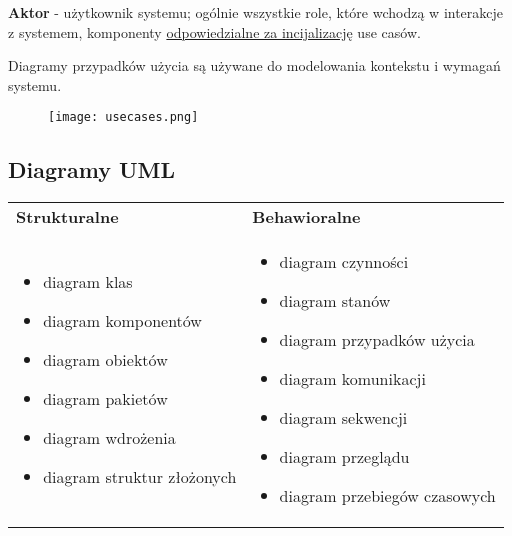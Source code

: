 \documentclass[../main.tex]{subfiles}
\begin{document}
    \textbf{Aktor} - użytkownik systemu; ogólnie wszystkie role, które wchodzą w interakcje z systemem, komponenty \underline{odpowiedzialne
    za incijalizację} use casów.

    Diagramy przypadków użycia są używane do modelowania kontekstu i wymagań systemu.

    \begin{figure}[H]
        \texttt{[image: usecases.png]}
    \end{figure}


    \subsection{Diagramy UML}
    \begin{table}[H]
        \begin{center}
            \begin{tabular}{  p{8cm} p{8cm} }
                \toprule
                \textbf{Strukturalne} & \textbf{Behawioralne}\\

                \cmidrule(r){1-1}\cmidrule(r){2-2}

                \begin{itemize}
                    \item diagram klas
                    \item diagram komponentów
                    \item diagram obiektów
                    \item diagram pakietów
                    \item diagram wdrożenia
                    \item diagram struktur złożonych
                \end{itemize}
                &
                \begin{itemize}
                    \item diagram czynności
                    \item diagram stanów
                    \item diagram przypadków użycia
                    \item diagram komunikacji
                    \item diagram sekwencji
                    \item diagram przeglądu
                    \item diagram przebiegów czasowych
                \end{itemize}
                \\

                \bottomrule
            \end{tabular}
        \end{center}
    \end{table}
\end{document}
